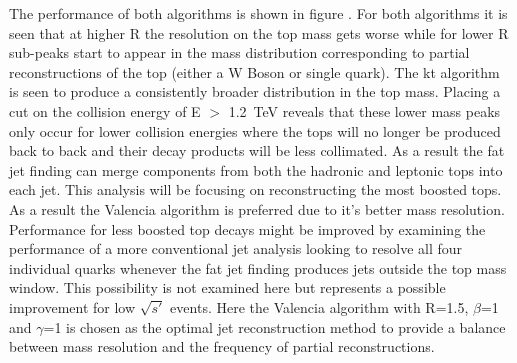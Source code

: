 The performance of both algorithms is shown in figure . For both algorithms it is seen that at higher R the resolution on the top mass gets worse while for lower R sub-peaks start to appear in the mass distribution corresponding to partial reconstructions of the top (either a W Boson or single quark). The kt algorithm is seen to produce a consistently broader distribution in the top mass. Placing a cut on the collision energy of E $>$ 1.2~TeV reveals that these lower mass peaks only occur for lower collision energies where the tops will no longer be produced back to back and their decay products will be less collimated. As a result the fat jet finding can merge components from both the hadronic and leptonic tops into each jet. This analysis will be focusing on reconstructing the most boosted tops. As a result the Valencia algorithm is preferred due to it's better mass resolution. Performance for less boosted top decays might be improved by examining the performance of a more conventional jet analysis looking to resolve all four individual quarks whenever the fat jet finding produces jets outside the top mass window. This possibility is not examined here but represents a possible improvement for low $\sqrt{s'}$ events. Here the Valencia algorithm with R=1.5, $\beta$=1 and $\gamma$=1 is chosen as the optimal jet reconstruction method to provide a balance between mass resolution and the frequency of partial reconstructions. 

